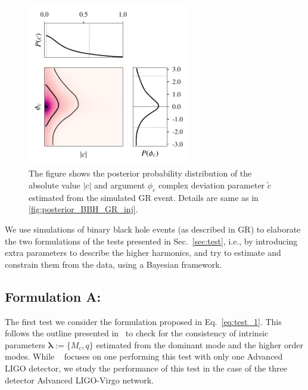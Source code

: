 \documentclass[prd,preprintnumbers,twocolumn,eqsecnum,floatfix,a4paper,nofootinbib,superscriptaddress]{revtex4}
\newcommand{\blambda}{\bm{\lambda}}
\begin{document}
\begin{figure}[tbh]
	\begin{center}
		\includegraphics[width=2.8in]{figs/M_80_q_9_SNR_25_complex_c1.pdf}
	\end{center} 
	\caption{The figure shows the posterior probability distribution of the absolute value $|c|$ and argument $\phi_c$ complex deviation parameter $\tilde{c}$ estimated from the simulated GR event. Details are same as in \ref{fig:posterior_BBH_GR_inj}.}
	\label{fig:c1_complex}
\end{figure}

We use simulations of binary black hole events (as described in GR) to elaborate the two formulations of the tests presented in Sec.~\ref{sec:test}, i.e., by introducing extra parameters to describe the higher harmonics, and try to estimate and constrain them from the data, using a Bayesian framework.

\subsection{Formulation A:}
\label{sec:formulationA}
The first test we consider the formulation proposed in Eq.~\eqref{eq:test_1}. This follows the outline presented in~\cite{Dhanpal:2018ufk} to check for the consistency of intrinsic parameters $\blambda := \{M_c, q\}$ estimated from the dominant mode and the higher order modes. While ~\cite{Dhanpal:2018ufk} focuses on one performing this test with only one Advanced LIGO detector, we study the performance of this test in the case of the three detector Advanced LIGO-Virgo network. 
\end{document}
